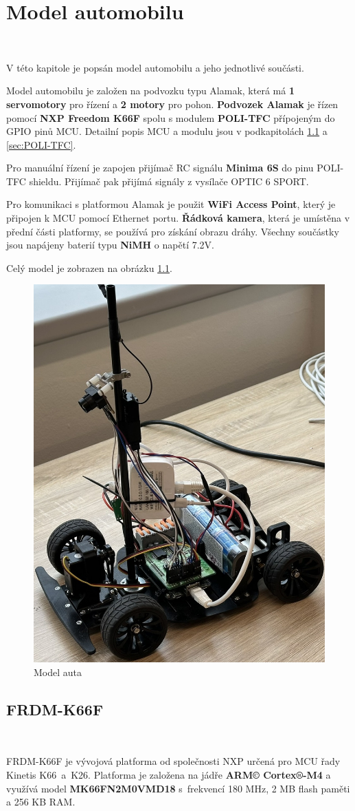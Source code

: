 \chapter{Model automobilu}
\label{sec:CarModel}
\vspace{-35pt}\


V této kapitole je popsán model automobilu a jeho jednotlivé součásti.

Model automobilu je založen na podvozku typu Alamak, která má \textbf{1 servomotory}
pro řízení a \textbf{2 motory} pro pohon.
\textbf{Podvozek Alamak} je řízen pomocí \textbf{NXP Freedom K66F}\cite{frdmk66UserGuide} spolu s modulem \textbf{POLI-TFC} přípojeným do GPIO pinů
MCU. Detailní popis MCU a modulu jsou v podkapitolách \ref{sec:FRDM-K66F}
a \ref{sec:POLI-TFC}.

Pro manuální řízení je zapojen přijímač RC signálu \textbf{Minima 6S} do pinu
POLI-TFC shieldu. Přijímač pak přijímá signály z vysílače OPTIC 6 SPORT.

Pro komunikaci s platformou Alamak je použit \textbf{WiFi Access Point}, který je
připojen k MCU pomocí Ethernet portu. \textbf{Řádková kamera}, která je umístěna
v přední části platformy, se používá pro získání obrazu dráhy. Všechny součástky
jsou napájeny baterií typu \textbf{NiMH} o napětí 7.2V.

Celý model je zobrazen na obrázku \ref{fig:car}.
\begin{figure}[!h]
    \centering
    \includegraphics[width = .4\linewidth]{Figures/Car.jpeg}
    \caption{Model auta}
    \label{fig:car}
\end{figure}

\section{FRDM-K66F}
\label{sec:FRDM-K66F}\

FRDM-K66F je vývojová platforma od společnosti NXP určená pro MCU řady Kinetis
K66~a~K26. Platforma je založena na jádře \textbf{ARM© Cortex®-M4} a využívá model
\textbf{MK66FN2M0VMD18} s~frekvencí 180 MHz, 2 MB flash paměti a 256 KB RAM.

